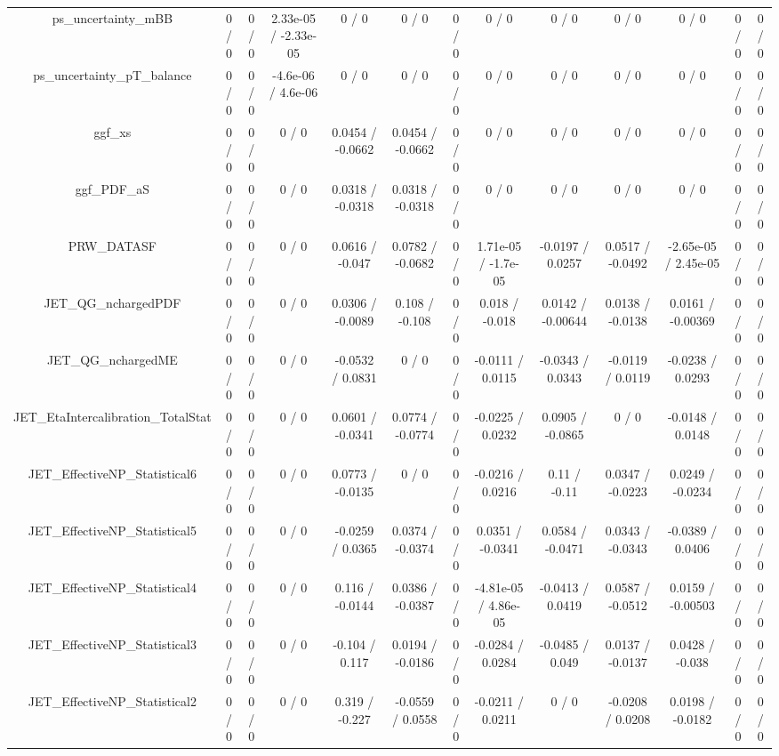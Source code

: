 \documentclass[10pt]{article}
\begin{document}
\begin{table}[htbp]
\begin{center}
\begin{tabular}{|c|c|c|c|c|c|c|c|c|c|c|c|c|}
  ps_uncertainty_mBB & 0 / 0 & 0 / 0 & 2.33e-05 / -2.33e-05 & 0 / 0 & 0 / 0 & 0 / 0 & 0 / 0 & 0 / 0 & 0 / 0 & 0 / 0 & 0 / 0 & 0 / 0 \\ 
  ps_uncertainty_pT_balance & 0 / 0 & 0 / 0 & -4.6e-06 / 4.6e-06 & 0 / 0 & 0 / 0 & 0 / 0 & 0 / 0 & 0 / 0 & 0 / 0 & 0 / 0 & 0 / 0 & 0 / 0 \\ 
  ggf_xs & 0 / 0 & 0 / 0 & 0 / 0 & 0.0454 / -0.0662 & 0.0454 / -0.0662 & 0 / 0 & 0 / 0 & 0 / 0 & 0 / 0 & 0 / 0 & 0 / 0 & 0 / 0 \\ 
  ggf_PDF_aS & 0 / 0 & 0 / 0 & 0 / 0 & 0.0318 / -0.0318 & 0.0318 / -0.0318 & 0 / 0 & 0 / 0 & 0 / 0 & 0 / 0 & 0 / 0 & 0 / 0 & 0 / 0 \\ 
  PRW_DATASF & 0 / 0 & 0 / 0 & 0 / 0 & 0.0616 / -0.047 & 0.0782 / -0.0682 & 0 / 0 & 1.71e-05 / -1.7e-05 & -0.0197 / 0.0257 & 0.0517 / -0.0492 & -2.65e-05 / 2.45e-05 & 0 / 0 & 0 / 0 \\ 
  JET_QG_nchargedPDF & 0 / 0 & 0 / 0 & 0 / 0 & 0.0306 / -0.0089 & 0.108 / -0.108 & 0 / 0 & 0.018 / -0.018 & 0.0142 / -0.00644 & 0.0138 / -0.0138 & 0.0161 / -0.00369 & 0 / 0 & 0 / 0 \\ 
  JET_QG_nchargedME & 0 / 0 & 0 / 0 & 0 / 0 & -0.0532 / 0.0831 & 0 / 0 & 0 / 0 & -0.0111 / 0.0115 & -0.0343 / 0.0343 & -0.0119 / 0.0119 & -0.0238 / 0.0293 & 0 / 0 & 0 / 0 \\ 
  JET_EtaIntercalibration_TotalStat & 0 / 0 & 0 / 0 & 0 / 0 & 0.0601 / -0.0341 & 0.0774 / -0.0774 & 0 / 0 & -0.0225 / 0.0232 & 0.0905 / -0.0865 & 0 / 0 & -0.0148 / 0.0148 & 0 / 0 & 0 / 0 \\ 
  JET_EffectiveNP_Statistical6 & 0 / 0 & 0 / 0 & 0 / 0 & 0.0773 / -0.0135 & 0 / 0 & 0 / 0 & -0.0216 / 0.0216 & 0.11 / -0.11 & 0.0347 / -0.0223 & 0.0249 / -0.0234 & 0 / 0 & 0 / 0 \\ 
  JET_EffectiveNP_Statistical5 & 0 / 0 & 0 / 0 & 0 / 0 & -0.0259 / 0.0365 & 0.0374 / -0.0374 & 0 / 0 & 0.0351 / -0.0341 & 0.0584 / -0.0471 & 0.0343 / -0.0343 & -0.0389 / 0.0406 & 0 / 0 & 0 / 0 \\ 
  JET_EffectiveNP_Statistical4 & 0 / 0 & 0 / 0 & 0 / 0 & 0.116 / -0.0144 & 0.0386 / -0.0387 & 0 / 0 & -4.81e-05 / 4.86e-05 & -0.0413 / 0.0419 & 0.0587 / -0.0512 & 0.0159 / -0.00503 & 0 / 0 & 0 / 0 \\ 
  JET_EffectiveNP_Statistical3 & 0 / 0 & 0 / 0 & 0 / 0 & -0.104 / 0.117 & 0.0194 / -0.0186 & 0 / 0 & -0.0284 / 0.0284 & -0.0485 / 0.049 & 0.0137 / -0.0137 & 0.0428 / -0.038 & 0 / 0 & 0 / 0 \\ 
  JET_EffectiveNP_Statistical2 & 0 / 0 & 0 / 0 & 0 / 0 & 0.319 / -0.227 & -0.0559 / 0.0558 & 0 / 0 & -0.0211 / 0.0211 & 0 / 0 & -0.0208 / 0.0208 & 0.0198 / -0.0182 & 0 / 0 & 0 / 0 \\ 

\end{tabular}
\end{center}
\end{table}
\end{document}
